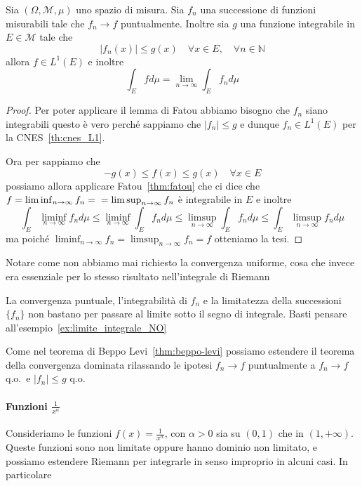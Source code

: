 \begin{theorem}\label{thm:Lebesgue_conv_dom}
    Sia \({(\Omega, \mathcal{M}, \mu)}\) uno spazio di misura. Sia \(f_{n}\) una
    successione di funzioni misurabili tale che \(f_{n} \to f\) puntualmente.
    Inoltre sia \(g\) una funzione integrabile in \(E \in \mathcal{M}\) tale che 
    \[
        |f_{n}{(x)}| \le g{(x)} \quad \forall x \in E, \quad \forall n \in \mathbb{N}
    \]
    allora \(f \in L^{1}{(E)}\) e inoltre
    \[
        \int_E f d\mu = \lim_{n \to \infty} \int_E f_{n} d\mu
    \]
\end{theorem}
\begin{proof}
    Per poter applicare il lemma di Fatou abbiamo bisogno che \(f_{n}\) siano
    integrabili questo è vero perché sappiamo che \(|f_{n}| \le g\) e dunque
    \(f_{n} \in L^{1}{(E)}\) per la CNES~\ref{th:cnes_L1}.

    Ora per sappiamo che
    \[
        -g{(x)} \le f{(x)} \le g{(x)} \quad \forall x \in E
    \]
    possiamo allora applicare Fatou~\ref{thm:fatou} che ci dice che \(f =
    \liminf_{n \to \infty} f_{n} = \\ = \limsup_{n \to \infty} f_{n} \) è integrabile
    in \(E\) e inoltre 
    \[
        \int_E \liminf_{n \to \infty} f_{n} d\mu \le \liminf_{n \to \infty} \int_E f_{n} d\mu \le \limsup_{n
        \to \infty} \int_E f_{n} d\mu \le \int_E \limsup_{n \to \infty}f_{n}  d\mu
    \]
    ma poiché \(\liminf_{n \to \infty} f_{n} = \limsup_{n \to \infty} f_{n} =
    f\) otteniamo la tesi.
\end{proof}
Notare come non abbiamo mai richiesto la convergenza uniforme, cosa che invece
era essenziale per lo stesso risultato nell'integrale di Riemann

\begin{note}
    La convergenza puntuale, l'integrabilità di \(f_{n}\) e la limitatezza della
    successioni \(\{f_{n}\} \)  non bastano per passare al limite sotto il segno
di integrale. Basti pensare all'esempio~\ref{ex:limite_integrale_NO}
\end{note}

\begin{remark}
    Come nel teorema di Beppo Levi~\ref{thm:beppo-levi} possiamo estendere il
    teorema della convergenza dominata rilassando le ipotesi \(f_{n} \to f\)
    puntualmente a \(f_{n} \to f\) q.o.~e \(|f_{n}| \le g\) q.o.
\end{remark}


\paragraph{Funzioni \(\frac{1}{x^{\alpha}}\)} Consideriamo le funzioni \(f{(x)}
= \frac{1}{x^{\alpha}}\), con \(\alpha>0\) sia su \((0,1)\) che in \({(1,
+\infty)}\). Queste funzioni sono non limitate oppure hanno dominio non
limitato, e possiamo estendere Riemann per integrarle in senso improprio in
alcuni casi. In particolare

